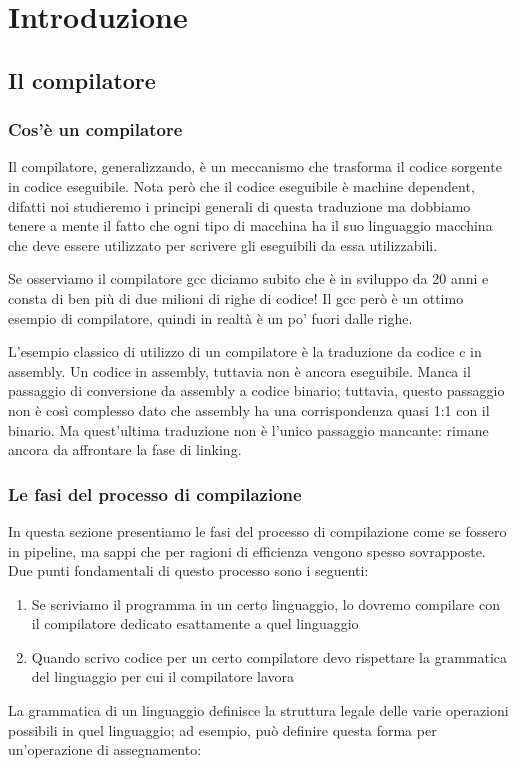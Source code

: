 \documentclass[class=book, crop=false, oneside]{standalone}
\begin{document}
\chapter{Introduzione}

\section{Il compilatore}
\subsection{Cos'è un compilatore}
Il compilatore, generalizzando, è un meccanismo che trasforma il codice sorgente in codice eseguibile.
Nota però che il codice eseguibile è machine dependent, difatti noi studieremo i principi generali di questa traduzione ma dobbiamo tenere a mente il fatto che ogni tipo di macchina ha il suo linguaggio macchina che deve essere utilizzato per scrivere gli eseguibili da essa utilizzabili.


Se osserviamo il compilatore gcc diciamo subito che è in sviluppo da 20 anni e consta di ben più di due milioni di righe di codice! Il gcc però è un ottimo esempio di compilatore, quindi in realtà è un po’ fuori dalle righe.


L’esempio classico di utilizzo di un compilatore è la traduzione da codice c in assembly.
Un codice in assembly, tuttavia non è ancora eseguibile. Manca il passaggio di conversione da assembly a codice binario; tuttavia, questo passaggio non è così complesso dato che assembly ha una corrispondenza quasi 1:1 con il binario.
Ma quest’ultima traduzione non è l’unico passaggio mancante: rimane ancora da affrontare la fase di linking.

\subsection{Le fasi del processo di compilazione}
In questa sezione presentiamo le fasi del processo di compilazione come se fossero in pipeline, ma sappi che per ragioni di efficienza vengono spesso sovrapposte. Due punti fondamentali di questo processo sono i seguenti:
\begin{enumerate}
    \item Se scriviamo il programma in un certo linguaggio, lo dovremo compilare con il compilatore dedicato esattamente a quel linguaggio
    \item Quando scrivo codice per un certo compilatore devo rispettare la grammatica del linguaggio per cui il compilatore lavora
\end{enumerate}
La grammatica di un linguaggio definisce la struttura legale delle varie operazioni possibili in quel linguaggio; ad esempio, può definire questa forma per un’operazione di assegnamento:
\end{document}
